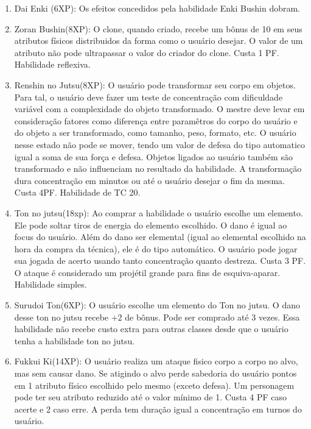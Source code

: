 \begin{enumerate}
	\item Dai Enki (6XP): Os efeitos concedidos pela habilidade Enki Bushin dobram.
	
	\item Zoran Bushin(8XP): O clone, quando criado, recebe um bônus de 10 em seus atributos físicos distribuidos da forma como o usuário desejar. O valor de um atributo não pode ultrapassar o valor do criador do clone. Custa 1 PF. Habilidade reflexiva.
	
	\item Renshin no Jutsu(8XP): O usuário pode transformar seu corpo em objetos. Para tal, o usuário deve fazer um teste de concentração com dificuldade variável com a complexidade do objeto transformado. O mestre deve levar em consideração fatores como diferença entre paramêtros do corpo do usuário e do objeto a ser transformado, como tamanho, peso, formato, etc. O usuário nesse estado não pode se mover, tendo um valor de defesa do tipo automatico igual a soma de sua força e defesa. Objetos ligados ao usuário também são transformado e não influenciam no resultado da habilidade. A transformação dura concentração em minutos ou até o usuário desejar o fim da mesma. Custa 4PF. Habilidade de TC 20.
	
	\item Ton no jutsu(18xp): Ao comprar a habilidade o usuário escolhe um elemento. Ele pode soltar tiros de energia do elemento escolhido. O dano é igual ao focus do usuário. Além do dano ser elemental (igual ao elemental escolhido na hora da compra da técnica), ele é do tipo automático. O usuário pode jogar sua jogada de acerto usando tanto concentração quanto destreza. Custa 3 PF. O ataque é considerado um projétil grande para fins de esquiva-aparar. Habilidade simples.

	\item Surudoi Ton(6XP): O usuário escolhe um elemento do Ton no jutsu. O dano desse ton no jutsu recebe +2 de bônus. Pode ser comprado até 3 vezes. Essa habilidade não recebe custo extra para outras classes desde que o usuário tenha a habilidade ton no jutsu.

	\item Fukkui Ki(14XP): O usuário realiza um ataque fisico corpo a corpo no alvo, mas sem causar dano. Se atigindo o alvo perde sabedoria do usuário pontos em 1 atributo físico escolhido pelo mesmo (exceto defesa). Um personagem pode ter seu atributo reduzido até o valor mínimo de 1. Custa 4 PF caso acerte e 2 caso erre. A perda tem duração igual a concentração em turnos do usuário. 


\end{enumerate}
